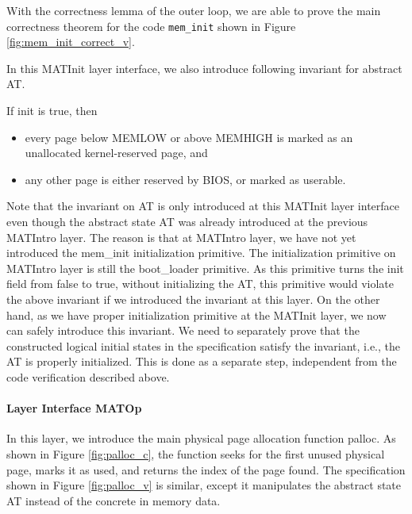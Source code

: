 With the correctness lemma of the outer loop, we are able to prove the main correctness theorem for
the code \texttt{mem\_init} shown in Figure \ref{fig:mem_init_correct_v}.

In this MATInit layer interface, we also introduce following invariant for abstract \textsf{AT}.

\begin{invariant}[valid AT] If \textsf{init} is \textsf{true}, then
\begin{itemize}
\item every page below \textsf{MEMLOW} or above \textsf{MEMHIGH} is marked as an unallocated kernel-reserved page, and
\item any other page is either reserved by BIOS, or marked as userable.
\end{itemize}
\end{invariant}

Note that the invariant on \textsf{AT} is only introduced at this MATInit layer interface even though the abstract
state \textsf{AT} was already introduced at the previous MATIntro layer. The reason is that at MATIntro layer, 
we have not yet introduced the \textsf{mem\_init} initialization primitive. The initialization primitive on MATIntro layer
is still the \textsf{boot\_loader} primitive. As this primitive turns the \textsf{init} field from \textsf{false} to \textsf{true},
without initializing the \textsf{AT}, this primitive would violate the above invariant if we introduced the invariant at this layer.
On the other hand, as we have proper initialization primitive at the MATInit layer, we now can safely introduce this invariant.
We need to separately prove that the constructed logical initial states in the specification satisfy the invariant, i.e., the \textsf{AT}
is properly initialized. This is done as a separate step, independent from the code verification described above.


\paragraph{Layer Interface MATOp}

In this layer, we introduce the main physical page allocation function \textsf{palloc}.
As shown in Figure \ref{fig:palloc_c}, the function seeks for the first unused physical page,
marks it as used, and returns the index of the page found.
The specification shown in Figure \ref{fig:palloc_v} is similar, except it manipulates
the abstract state \textsf{AT} instead of the concrete in memory data.

